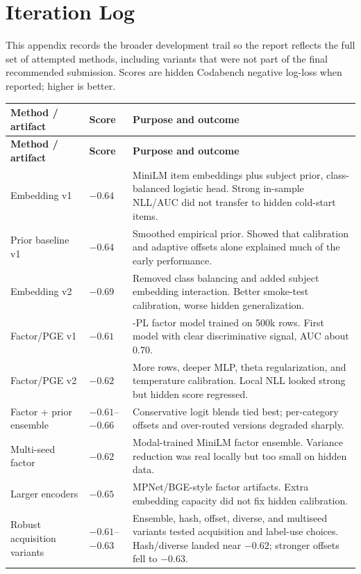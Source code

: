 \documentclass{article}
\begin{document}
\appendix
\section{Iteration Log}
\label{app:iteration-log}

This appendix records the broader development trail so the report reflects the full set of attempted methods, including variants that were not part of the final recommended submission. Scores are hidden Codabench negative log-loss when reported; higher is better.

\small
\begin{longtable}{@{}>{\raggedright\arraybackslash}p{}>{\raggedright\arraybackslash}p{}>{\raggedright\arraybackslash}p{}@{}}
\toprule
\textbf{Method / artifact} & \textbf{Score} & \textbf{Purpose and outcome} \\
\midrule
\endfirsthead
\toprule
\textbf{Method / artifact} & \textbf{Score} & \textbf{Purpose and outcome} \\
\midrule
\endhead
Embedding v1 & $-0.64$ & MiniLM item embeddings plus subject prior, class-balanced logistic head. Strong in-sample NLL/AUC did not transfer to hidden cold-start items. \\
Prior baseline v1 & $-0.64$ & Smoothed empirical prior. Showed that calibration and adaptive offsets alone explained much of the early performance. \\
Embedding v2 & $-0.69$ & Removed class balancing and added subject embedding interaction. Better smoke-test calibration, worse hidden generalization. \\
Factor/PGE v1 & $-0.61$ & 2-PL factor model trained on 500k rows. First model with clear discriminative signal, AUC about 0.70. \\
Factor/PGE v2 & $-0.62$ & More rows, deeper MLP, theta regularization, and temperature calibration. Local NLL looked strong but hidden score regressed. \\
Factor + prior ensemble & $-0.61$--$-0.66$ & Conservative logit blends tied best; per-category offsets and over-routed versions degraded sharply. \\
Multi-seed factor & $-0.62$ & Modal-trained MiniLM factor ensemble. Variance reduction was real locally but too small on hidden data. \\
Larger encoders & $-0.65$ & MPNet/BGE-style factor artifacts. Extra embedding capacity did not fix hidden calibration. \\
Robust acquisition variants & $-0.61$--$-0.63$ & Ensemble, hash, offset, diverse, and multiseed variants tested acquisition and label-use choices. Hash/diverse landed near $-0.62$; stronger offsets fell to $-0.63$. \\

\end{longtable}
\end{document}
